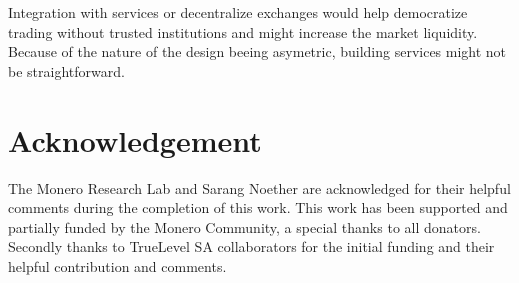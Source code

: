 \documentclass{llncs}
\begin{document}
Integration with services or decentralize exchanges would help democratize trading without trusted institutions and might increase the market liquidity. Because of the nature of the design beeing asymetric, building services might not be straightforward.

\section{Acknowledgement}
The Monero Research Lab and Sarang Noether are acknowledged for their helpful comments during the completion of this work. This work has been supported and partially funded by the Monero Community, a special thanks to all donators. Secondly thanks to TrueLevel SA collaborators for the initial funding and their helpful contribution and comments.

%
%
\printbibliography
\end{document}
